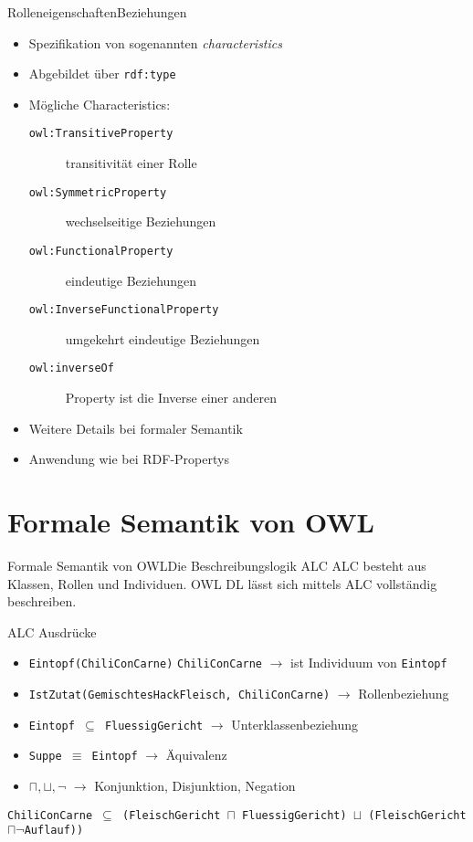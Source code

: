 \documentclass{beamer}
\begin{document}
%
\begin{frame}[fragile]{Rolleneigenschaften}{Beziehungen}
\begin{itemize}
\item Spezifikation von sogenannten \emph{characteristics}
\item Abgebildet über \texttt{rdf:type}
\item Mögliche Characteristics:
\begin{description}
\item[\texttt{owl:TransitiveProperty}] transitivität einer Rolle
\item[\texttt{owl:SymmetricProperty}] wechselseitige Beziehungen
\item[\texttt{owl:FunctionalProperty}] eindeutige Beziehungen
\item[\texttt{owl:InverseFunctionalProperty}] umgekehrt eindeutige Beziehungen
\item[\texttt{owl:inverseOf}] Property ist die Inverse einer anderen 


\end{description}
\item Weitere Details bei formaler Semantik
\item Anwendung wie bei RDF-Propertys
\end{itemize}
\end{frame}

\section{Formale Semantik von OWL}

\begin{frame}[fragile]{Formale Semantik von OWL}{Die Beschreibungslogik ALC}
ALC besteht aus Klassen, Rollen und Individuen. OWL DL lässt sich mittels ALC vollständig
beschreiben.
\begin{block}{ALC Ausdrücke}
\begin{itemize}
	\item \texttt{Eintopf(ChiliConCarne)} \texttt{ChiliConCarne} $ \rightarrow $ ist Individuum von \texttt{Eintopf} 
	\item \texttt{IstZutat(GemischtesHackFleisch, ChiliConCarne)} $ \rightarrow $ Rollenbeziehung
	\item \texttt{Eintopf $ \subseteq $ FluessigGericht} $ \rightarrow $ Unterklassenbeziehung
	\item \texttt{Suppe $ \equiv $ Eintopf} $ \rightarrow $ Äquivalenz
	\item \texttt{$ \sqcap, \sqcup, \neg $} $ \rightarrow $ Konjunktion, Disjunktion, Negation
\end{itemize}
\texttt{ChiliConCarne $ \subseteq $ (FleischGericht $ \sqcap $ FluessigGericht) $ \sqcup $ (FleischGericht $ \sqcap \neg $Auflauf))}
\end{block}
\end{frame}
\end{document}
